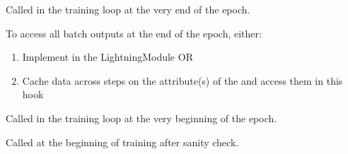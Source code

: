 \documentclass[letterpaper,10pt,english]{sphinxmanual}
\begin{document}
\begin{fulllineitems}
\begin{fulllineitems}
\label{\detokenize{pages/ml:vipercore.ml.plmodels.GeneralModel.on_train_epoch_end}}
\sphinxAtStartPar
Called in the training loop at the very end of the epoch.

\sphinxAtStartPar
To access all batch outputs at the end of the epoch, either:
\begin{enumerate}
%
\item {} 
\sphinxAtStartPar
Implement  in the LightningModule OR

\item {} 
\sphinxAtStartPar
Cache data across steps on the attribute(s) of the  and access them in this hook

\end{enumerate}

\end{fulllineitems}


\begin{fulllineitems}
\label{\detokenize{pages/ml:vipercore.ml.plmodels.GeneralModel.on_train_epoch_start}}
\sphinxAtStartPar
Called in the training loop at the very beginning of the epoch.

\end{fulllineitems}


\begin{fulllineitems}
\label{\detokenize{pages/ml:vipercore.ml.plmodels.GeneralModel.on_train_start}}
\sphinxAtStartPar
Called at the beginning of training after sanity check.

\end{fulllineitems}



\end{fulllineitems}
\end{document}
